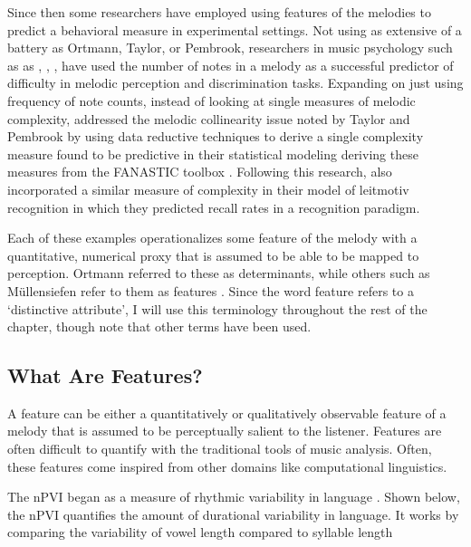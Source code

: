 \documentclass[12pt,]{book}
\begin{document}
Since then some researchers have employed using features of the melodies to predict a behavioral measure in experimental settings.
Not using as extensive of a battery as Ortmann, Taylor, or Pembrook, researchers in music psychology such as as \citet{akiva-kabiriMemoryTonalPitches2009}, \citet{dewittRecognitionNovelMelodies1986}, \citet{eerolaExpectancySamiYoiks2009}, \citet{schulzeWorkingMemorySpeech2012} have used the number of notes in a melody as a successful predictor of difficulty in melodic perception and discrimination tasks.
Expanding on just using frequency of note counts, \citet{harrisonModellingMelodicDiscrimination2016} instead of looking at single measures of melodic complexity, addressed the melodic collinearity issue noted by Taylor and Pembrook by using data reductive techniques to derive a single complexity measure found to be predictive in their statistical modeling deriving these measures from the FANASTIC toolbox \citep{mullensiefenFantasticFeatureANalysis2009}.
Following this research, \citet{bakerPerceptionLeitmotivesRichard2017} also incorporated a similar measure of complexity in their model of leitmotiv recognition in which they predicted recall rates in a recognition paradigm.

Each of these examples operationalizes some feature of the melody with a quantitative, numerical proxy that is assumed to be able to be mapped to perception.
Ortmann referred to these as determinants, while others such as Müllensiefen refer to them as features \citep{mullensiefenFantasticFeatureANalysis2009}.
Since the word feature refers to a `distinctive attribute', I will use this terminology throughout the rest of the chapter, though note that other terms have been used.

\hypertarget{what-are-features}{%
\subsection{What Are Features?}\label{what-are-features}}

A feature can be either a quantitatively or qualitatively observable feature of a melody that is assumed to be perceptually salient to the listener.
Features are often difficult to quantify with the traditional tools of music analysis.
Often, these features come inspired from other domains like computational linguistics.

The nPVI began as a measure of rhythmic variability in language \citep{grabeDurationalVariabilitySpeech2002}.
Shown below, the nPVI quantifies the amount of durational variability in language.
It works by comparing the variability of vowel length compared to syllable length
\end{document}
